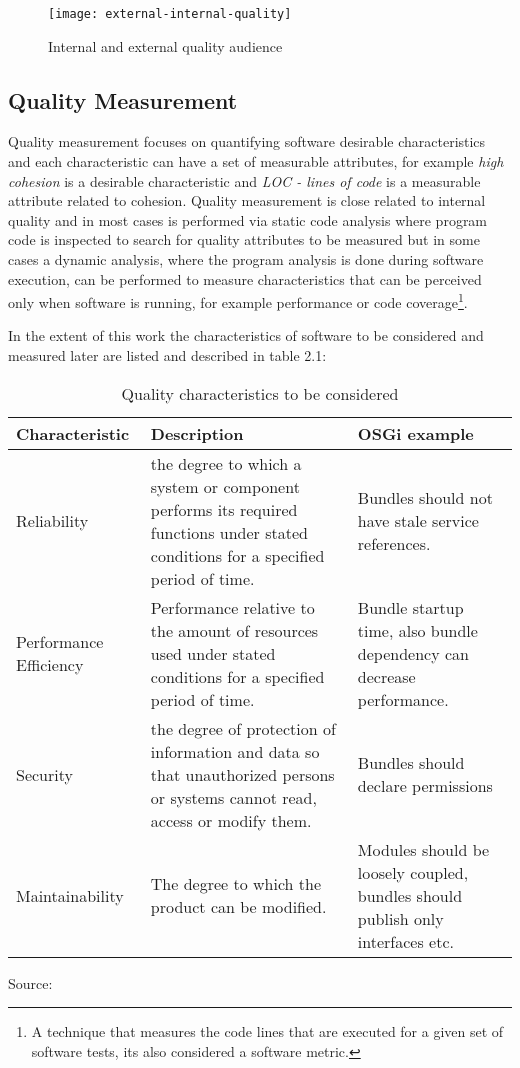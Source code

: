 \begin{figure}[h]
\caption{Internal and external quality audience}
\centering
\texttt{[image: external-internal-quality]}
\end{figure}
\FloatBarrier


\subsection{Quality Measurement}
Quality measurement focuses on quantifying software desirable characteristics and each characteristic can have a set of measurable attributes, for example \textit{high cohesion} is a desirable characteristic and \textit{LOC - lines of code} is a measurable attribute related to cohesion. Quality measurement is close related to internal quality and in most cases is performed via static code analysis where program code is inspected to search for quality attributes to be measured but in some cases a dynamic analysis, where the program analysis is done during software execution, can be performed to measure characteristics that can be perceived only when software is running, for example performance or code coverage\footnote{A technique that measures the code lines that are executed for a given set of software tests, its also considered a software metric.}.     

In the extent of this work the characteristics of software to be considered and measured later are listed and described in table 2.1:  

\begin{table}[h]
\caption{Quality characteristics to be considered}
\begin{center}
    \begin{tabular}{  p{3cm} | p{8cm} | p{5cm} }
    \hline
    Characteristic & Description & OSGi example \\  \hline
    Reliability & the degree to which a system or component performs its required functions under stated conditions for a specified period of time. & Bundles should not have stale service references.\\ \hline
    Performance Efficiency & Performance relative to the amount of resources used under stated conditions for a specified
period of time. & Bundle startup time, also bundle dependency can decrease performance. \\ \hline
    Security & the degree of protection of information and data so that unauthorized persons or systems cannot read, access or modify them. & Bundles should declare permissions \\ \hline
    Maintainability & The degree to which the product can be modified. & Modules should be loosely coupled, bundles should publish only interfaces etc. \\ 
    \hline
     
    \end{tabular}
    Source: \cite{cisq 2012}
\end{center}
\end{table}
\FloatBarrier

